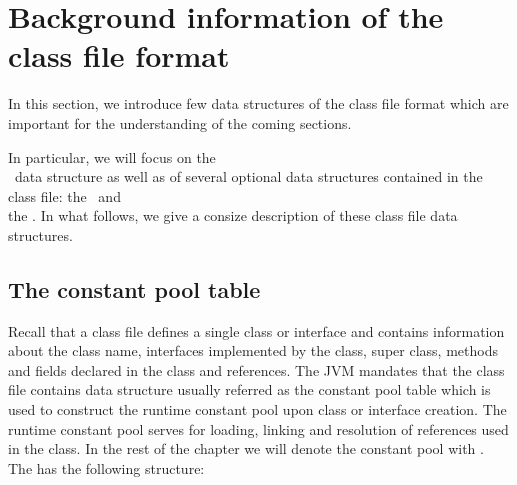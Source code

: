 \newcommand{\cpLength}{\mbox{\rm\textsf{cpLength}}}
\newcommand{\cpElems}{\mbox{\rm\textsf{cpElems}}}
\newcommand{\classConst}{\mbox{\rm\textbf{cpConst}}}
\newcommand{\locVarTab}{\mbox{\rm\textsf{}}}

\section{Background information of the class file format}
In this section,  we introduce few data structures of the class file format which are important
for the understanding of the coming sections.



 In particular, we will focus on the \\
 \constantPool \ data structure as well as of several optional data structures
 contained in the  class file: the \localVariableTable \ and \\
the \lineNumberTable. 
In what follows, we give a consize description of these class file data structures. 


\subsection{The constant pool table}
 Recall that a class file defines
a single class or interface and contains information about  the class name, interfaces implemented by the class, super class, methods
 and fields declared in the class and references. The JVM  \cite{VMSpec} mandates that the class
 file contains data structure usually referred as the constant pool table  which is used to construct the runtime constant pool upon class or 
interface creation. The runtime constant pool serves for loading, linking and resolution of references used in the class.
In the rest of the chapter we will denote the constant pool with \constantPool.
The \constantPool has the following structure:

